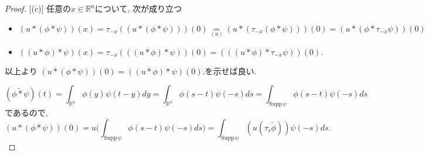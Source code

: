 \documentclass[dvipdfmx,a4paper,11pt]{article} %
\theoremstyle{definition}
\theoremstyle{remark}
\numberwithin{equation}{section}
\begin{document}
\begin{proof}

[(c)] 任意の\(x \in \mathbb{R}^n\)について, 次が成り立つ
\begin{itemize}
\item \((u \ast (\phi \ast \psi))(x) 
= \tau_{-x}((u \ast (\phi \ast \psi)))(0) 
\underset{(a)}{=} (u \ast (\tau_{-x}(\phi \ast \psi)))(0)
= (u \ast (\phi\ast \tau_{-x}\psi))(0) \)
\item \( ((u \ast \phi) \ast \psi)(x) = \tau_{-x}(((u \ast \phi) \ast \psi))(0) 
= (((u \ast \phi) \ast \tau_{-x}\psi))(0).\)
\end{itemize}
以上より \((u \ast (\phi \ast \psi))(0) = ((u \ast \phi) \ast \psi)(0).\)を示せば良い.

\[
(\widetilde{\phi \ast \psi})(t) 
= \int_{\mathbb{R}^n} \phi(y) \psi(t-y) dy
= \int_{\mathbb{R}^n} \phi(s-t) \psi(-s) ds 
= \int_{\mathrm{Supp}\,\psi} \phi(s-t)\psi(-s) ds
\]
であるので, 
\begin{equation}
\label{eq-1-thm-H-2.10}
 (u \ast (\phi \ast \psi))(0) 
 = u\Big( \int_{\mathrm{Supp}\,\psi} \phi(s-t)\psi(-s) ds \Big)
 =\int_{\mathrm{Supp}\,\psi} (u(\tau_s \widetilde{\phi})) \psi(-s) ds.
\end{equation}


\end{proof}
\end{document}
